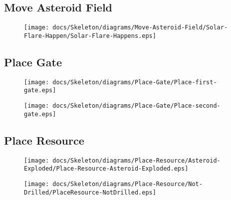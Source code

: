 \subsection{Move Asteroid Field}

\begin{figure}[H] 
    \centering 
    \texttt{[image: docs/Skeleton/diagrams/Move-Asteroid-Field/Solar-Flare-Happen/Solar-Flare-Happens.eps]} 
    \caption{} 
\end{figure} 

\subsection{Place Gate}

\begin{figure}[H] 
    \centering 
    \texttt{[image: docs/Skeleton/diagrams/Place-Gate/Place-first-gate.eps]} 
    \caption{} 
\end{figure} 

\begin{figure}[H] 
    \centering 
    \texttt{[image: docs/Skeleton/diagrams/Place-Gate/Place-second-gate.eps]} 
    \caption{} 
\end{figure} 



\subsection{Place Resource}

\begin{figure}[H] 
    \centering 
    \texttt{[image: docs/Skeleton/diagrams/Place-Resource/Asteroid-Exploded/Place-Resource-Asteroid-Exploded.eps]} 
    \caption{} 
\end{figure} 

\begin{figure}[H] 
    \centering 
    \texttt{[image: docs/Skeleton/diagrams/Place-Resource/Not-Drilled/PlaceResource-NotDrilled.eps]} 
    \caption{} 
\end{figure} 